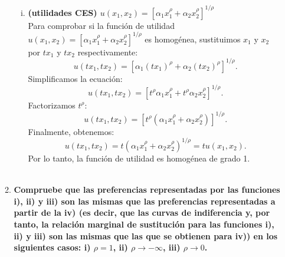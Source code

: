 \begin{enumerate}
\begin{enumerate}[\bfseries a)]
\begin{enumerate}[i)]
		\item \textbf{\boldmath (utilidades CES) $u(x_1,x_2)=\left[\alpha_1 x_1^{\rho}+\alpha_2 x_2^{\rho}\right]^{1/\rho}$}\\

		    Para comprobar si la función de utilidad $u(x_1,x_2)=\left[\alpha_1 x_1^{\rho}+\alpha_2 x_2^{\rho}\right]^{1/\rho}$ es homogénea, sustituimos $x_1$ y $x_2$ por $tx_1$ y $tx_2$ respectivamente:
		    $$u(tx_1,tx_2)=\left[\alpha_1 (tx_1)^{\rho}+\alpha_2 (tx_2)^{\rho}\right]^{1/\rho}.$$
		    Simplificamos la ecuación:
		    $$u(tx_1,tx_2)=\left[t^{\rho}\alpha_1 x_1^{\rho}+t^{\rho}\alpha_2 x_2^{\rho}\right]^{1/\rho}.$$
		    Factorizamos $t^{\rho}$:
		    $$u(tx_1,tx_2)=\left[t^{\rho}(\alpha_1 x_1^{\rho}+\alpha_2 x_2^{\rho})\right]^{1/\rho}.$$
		    Finalmente, obtenemos:
		    $$u(tx_1,tx_2)=t(\alpha_1 x_1^{\rho}+\alpha_2 x_2^{\rho})^{1/\rho}=tu(x_1,x_2).$$
		    Por lo tanto, la función de utilidad es homogénea de grado 1.\\\\

	    \end{enumerate}

	    \item \textbf{\boldmath Compruebe que las preferencias representadas por las funciones i), ii) y iii) son las mismas que las preferencias representadas a partir de la iv) (es decir, que las curvas de indiferencia y, por tanto, la relación marginal de sustitución para las funciones i), ii) y iii) son las mismas que las que se obtienen para iv)) en los siguientes casos: i) $\rho = 1$, ii) $\rho \to -\infty$, iii) $\rho\to 0$.}\\


\end{enumerate}
\end{enumerate}
